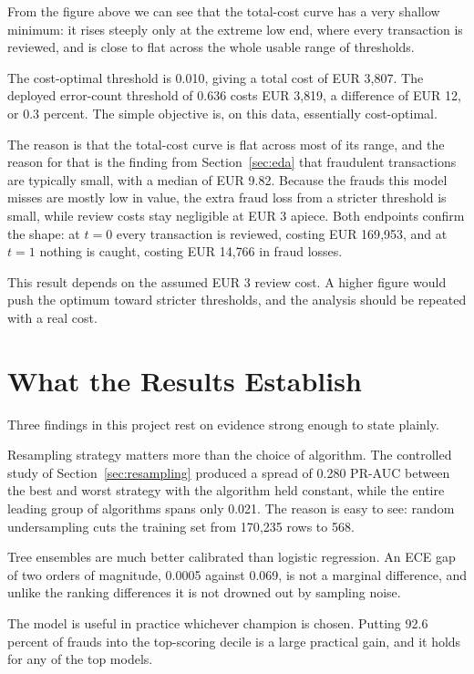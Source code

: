From the figure above we can see that the total-cost curve has a very shallow minimum: it
rises steeply only at the extreme low end, where every transaction is reviewed, and is
close to flat across the whole usable range of thresholds.

The cost-optimal threshold is 0.010, giving a total cost of EUR 3{,}807. The deployed
error-count threshold of 0.636 costs EUR 3{,}819, a difference of EUR 12, or 0.3
percent. The simple objective is, on this data, essentially cost-optimal.

The reason is that the total-cost curve is flat across most of its range, and the reason for
that is the finding from Section~\ref{sec:eda} that fraudulent transactions are typically
small, with a median of EUR 9.82. Because the frauds this model misses are mostly low in
value, the extra fraud loss from a stricter threshold is small, while review costs stay
negligible at EUR 3 apiece. Both endpoints confirm the shape: at $t = 0$ every transaction
is reviewed, costing EUR 169{,}953, and at $t = 1$ nothing is caught, costing EUR 14{,}766
in fraud losses.

This result depends on the assumed EUR 3 review cost. A higher figure would push the optimum
toward stricter thresholds, and the analysis should be repeated with a real cost.

\section{What the Results Establish}

Three findings in this project rest on evidence strong enough to state plainly.

Resampling strategy matters more than the choice of algorithm. The controlled
study of Section~\ref{sec:resampling} produced a spread of 0.280 PR-AUC between the best and
worst strategy with the algorithm held constant, while the entire leading group of
algorithms spans only 0.021. The reason is easy to see: random undersampling cuts the
training set from 170{,}235 rows to 568.

Tree ensembles are much better calibrated than logistic regression. An ECE gap of
two orders of magnitude, 0.0005 against 0.069, is not a marginal difference, and unlike the
ranking differences it is not drowned out by sampling noise.

The model is useful in practice whichever champion is chosen. Putting 92.6 percent
of frauds into the top-scoring decile is a large practical gain, and it holds for any of the
top models.

